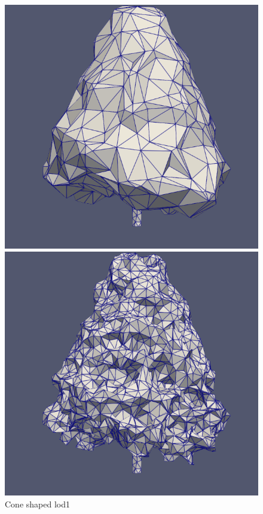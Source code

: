 \documentclass[12pt]{article}
\begin{document}
\begin{figure}[H]
    \centering
    \begin{minipage}{0.30\textwidth}
        \centering
        \includegraphics[width=1\textwidth]{images/tree-cone_lod1.png}
        \caption{Cone shaped lod1}
    \end{minipage}
    \begin{minipage}{0.30\textwidth}
        \centering
        \includegraphics[width=1\textwidth]{images/tree-cone_lod2.png}

\end{minipage}
\end{figure}
\end{document}
